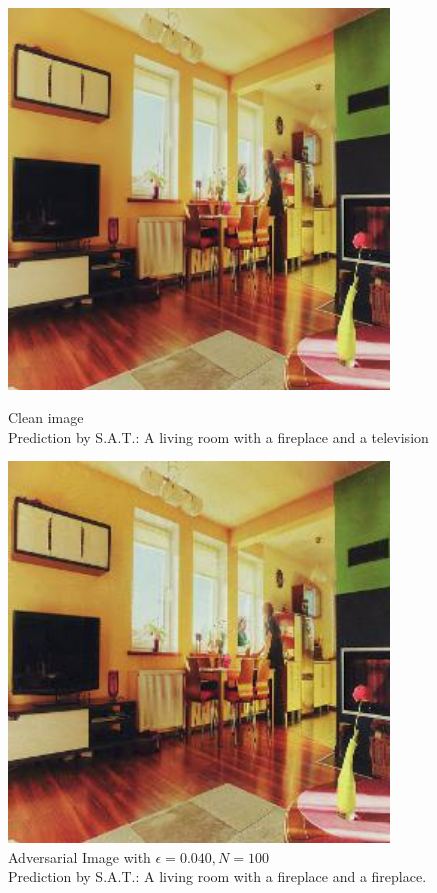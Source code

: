 \begin{figure}[ht]
    \centering
    \begin{minipage}{0.45\textwidth}
        \centering
        \includegraphics[width=0.9\textwidth]{figures/Distract/n=100/samples/0.000/img_0.jpg} %
        \caption*{Clean image\\Prediction by S.A.T.: A living room with a fireplace and a television}
    \end{minipage}\hfill
    \begin{minipage}{0.45\textwidth}
        \centering
        \includegraphics[width=0.9\textwidth]{figures/Distract/n=100/samples/0.040/img_0.jpg} %
        \caption*{Adversarial Image with $\epsilon=0.040, N=100$\\Prediction by S.A.T.: A living room with a fireplace and a fireplace.}
    \end{minipage}
\end{figure}

